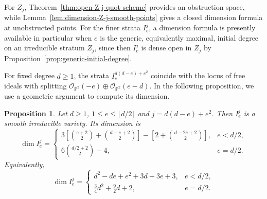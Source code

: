 \documentclass[11pt]{amsart} %
\newtheorem{Proposition}[Theorem]{Proposition}
\theoremstyle{definition}
\begin{document}
For $Z_j$, Theorem~\ref{thm:open-Z-j-quot-scheme} provides an
obstruction space, while
Lemma~\ref{lem:dimension-Z-j-smooth-points} gives a closed dimension
formula at unobstructed points. For the finer strata $I_e^j$, a
dimension formula is presently available in particular when $e$ is
the generic, equivalently maximal, initial degree on an irreducible
stratum $Z_j$, since then $I_e^j$ is dense open in $Z_j$ by
Proposition~\ref{prop:generic-initial-degree}.

For fixed degree $d \geq 1$, the strata $I_e^{d(d-e)+e^2}$ coincide with the locus of free ideals with splitting $\mathcal{O}_{\mathbb{P}^2}(-e) \oplus \mathcal{O}_{\mathbb{P}^2}(e-d)$. In the following proposition, we use a geometric argument to compute its dimension.

\begin{Proposition}\label{prop:free-strata-smooth}
Let $d\geq1$, \(
1\leq e\leq \lfloor d/2 \rfloor\) and \(j=d(d-e)+e^2\). Then $I_e^j$ is a smooth irreducible variety. Its dimension is
\[
\dim I_e^j
=
\begin{cases}
\displaystyle
3\left[
\binom{e+2}{2}
+
\binom{d-e+2}{2}
\right]
-
\left[
2+\binom{d-2e+2}{2}
\right],
& e<d/2,\\[4mm]
\displaystyle
6\binom{d/2+2}{2}-4,
& e=d/2.
\end{cases}
\]
Equivalently,
\[
\dim I_e^j
=
\begin{cases}
d^2-de+e^2+3d+3e+3,
& e<d/2,\\[2mm]
\displaystyle
\frac34d^2+\frac92d+2,
& e=d/2.
\end{cases}
\]
\end{Proposition}
\end{document}
